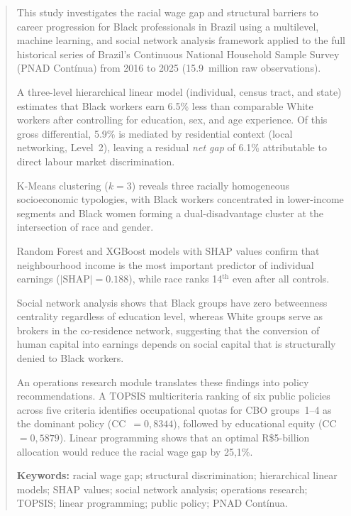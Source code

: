 \documentclass[12pt, a4paper, oneside]{article}
\begin{document}
\newpage

\renewcommand{\abstractname}{Abstract}
\begin{abstract}
\noindent
This study investigates the racial wage gap and structural barriers to career
progression for Black professionals in Brazil using a multilevel, machine
learning, and social network analysis framework applied to the full historical
series of Brazil's Continuous National Household Sample Survey (PNAD Contínua)
from 2016 to 2025 (15.9~million raw observations).

A three-level hierarchical linear model (individual, census tract, and state)
estimates that Black workers earn 6.5\% less than comparable White
workers after controlling for education, sex, and age experience.
Of this gross differential, 5.9\% is mediated by residential context
(local networking, Level~2), leaving a residual \textit{net gap} of
6.1\% attributable to direct labour market discrimination.

K-Means clustering ($k=3$) reveals three racially homogeneous
socioeconomic typologies, with Black workers concentrated in lower-income
segments and Black women forming a dual-disadvantage cluster at the
intersection of race and gender.

Random Forest and XGBoost models with SHAP values confirm that neighbourhood
income is the most important predictor of individual earnings
($|\text{SHAP}|=0.188$), while race ranks
14$^\text{th}$ even after all controls.

Social network analysis shows that Black groups have zero betweenness
centrality regardless of education level, whereas White groups serve as
brokers in the co-residence network, suggesting that the conversion of
human capital into earnings depends on social capital that is structurally
denied to Black workers.

An operations research module translates these findings into policy
recommendations. A TOPSIS multicriteria ranking of six public policies
across five criteria identifies occupational quotas for CBO groups~1--4
as the dominant policy (CC~$=0,8344$), followed by
educational equity (CC~$=0,5879$). Linear programming
shows that an optimal R\$5-billion allocation would reduce the racial
wage gap by 25,1\%.

\bigskip
\noindent\textbf{Keywords:} racial wage gap; structural discrimination;
hierarchical linear models; SHAP values; social network analysis;
operations research; TOPSIS; linear programming; public policy; PNAD Contínua.
\end{abstract}
\end{document}
